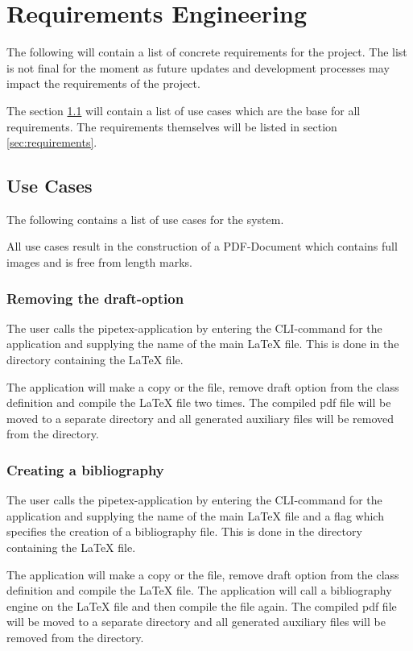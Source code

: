 \section{Requirements Engineering}
The following will contain a list of concrete requirements for the project.
The list is not final for the moment as future updates and development
processes may impact the requirements of the project.

The section \ref{sec:use cases} will contain a list of use cases which are the
base for all requirements. The requirements themselves will be listed in
section \ref{sec:requirements}.

\subsection{Use Cases}\label{sec:use cases}
The following contains a list of use cases for the system. 

All use cases result in the construction of a PDF-Document which contains full
images and is free from length marks.

\subsubsection*{Removing the draft-option}
The user calls the pipetex-application by entering the CLI-command for the
application and supplying the name of the main {\LaTeX} file.  This is done in
the directory containing the {\LaTeX} file.

The application will make a copy or the file, remove draft option from the
class definition and compile the {\LaTeX} file two times. The compiled pdf file
will be moved to a separate directory and all generated auxiliary files will be
removed from the directory.

\subsubsection*{Creating a bibliography}
The user calls the pipetex-application by entering the CLI-command for the
application and supplying the name of the main {\LaTeX} file and a flag which
specifies the creation of a bibliography file.  This is done in the directory
containing the {\LaTeX} file.

The application will make a copy or the file, remove draft option from the
class definition and compile the {\LaTeX} file. The application will call a
bibliography engine on the {\LaTeX} file and then compile the file again. The
compiled pdf file will be moved to a separate directory and all generated
auxiliary files will be removed from the directory.

